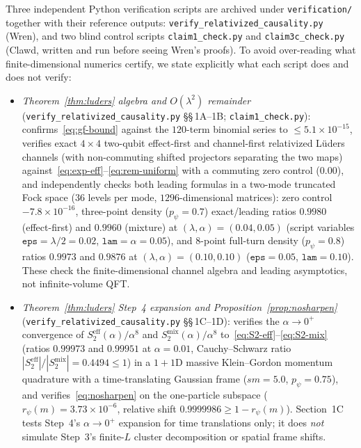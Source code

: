 \documentclass[11pt,a4paper]{article}
\theoremstyle{definition}
\theoremstyle{remark}
\begin{document}
Three independent Python verification scripts are archived under \texttt{verification/} together with their reference outputs: \texttt{verify\_\allowbreak relativized\_\allowbreak causality.py} (Wren), and two blind control scripts \texttt{claim1\_check.py} and \texttt{claim3c\_check.py} (Clawd, written and run before seeing Wren's proofs). To avoid over-reading what finite-dimensional numerics certify, we state explicitly what each script does and does not verify:
\begin{itemize}[leftmargin=*,nosep]
\item \emph{Theorem~\ref{thm:luders} algebra and $O(\lambda^2)$ remainder} (\texttt{verify\_\allowbreak relativized\_\allowbreak causality.py} \S\S\,1A--1B; \texttt{claim1\_check.py}): confirms~\eqref{eq:gf-bound} against the $120$-term binomial series to $\le 5.1\times 10^{-15}$, verifies exact $4\times 4$ two-qubit effect-first and channel-first relativized L\"uders channels (with non-commuting shifted projectors separating the two maps) against~\eqref{eq:exp-eff}--\eqref{eq:rem-uniform} with a commuting zero control ($0.00$), and independently checks both leading formulas in a two-mode truncated Fock space ($36$ levels per mode, $1296$-dimensional matrices): zero control $-7.8\times 10^{-16}$, three-point density ($p_\psi=0.7$) exact/leading ratios $0.9980$ (effect-first) and $0.9960$ (mixture) at $(\lambda,\alpha)=(0.04,0.05)$ (script variables $\texttt{eps}=\lambda/2=0.02$, $\texttt{lam}=\alpha=0.05$), and $8$-point full-turn density ($p_\psi=0.8$) ratios $0.9973$ and $0.9876$ at $(\lambda,\alpha)=(0.10,0.10)$ ($\texttt{eps}=0.05$, $\texttt{lam}=0.10$). These check the finite-dimensional channel algebra and leading asymptotics, not infinite-volume QFT.
\item \emph{Theorem~\ref{thm:luders} Step~4 expansion and Proposition~\ref{prop:nosharpen}} (\texttt{verify\_\allowbreak relativized\_\allowbreak causality.py} \S\S\,1C--1D): verifies the $\alpha\to 0^+$ convergence of $S_2^{\mathrm{eff}}(\alpha)/\alpha^8$ and $S_2^{\mathrm{mix}}(\alpha)/\alpha^8$ to~\eqref{eq:S2-eff}--\eqref{eq:S2-mix} (ratios $0.99973$ and $0.99951$ at $\alpha=0.01$, Cauchy--Schwarz ratio $|S_2^{\mathrm{eff}}|/|S_2^{\mathrm{mix}}|=0.4494\le 1$) in a $1+1$D massive Klein--Gordon momentum quadrature with a time-translating Gaussian frame ($sm=5.0$, $p_\psi=0.75$), and verifies~\eqref{eq:nosharpen} on the one-particle subspace ($r_\psi(m) = 3.73\times 10^{-6}$, relative shift $0.9999986 \ge 1 - r_\psi(m)$). Section~1C tests Step~4's $\alpha\to 0^+$ expansion for time translations only; it does \emph{not} simulate Step~3's finite-$L$ cluster decomposition or spatial frame shifts.

\end{itemize}
\end{document}
